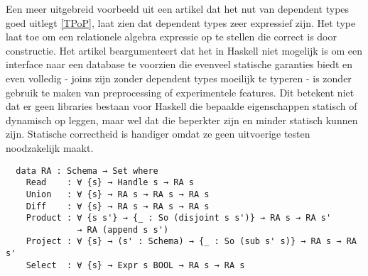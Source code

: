 Een meer uitgebreid voorbeeld uit een artikel dat het nut van dependent types
goed uitlegt \ref{TPoP}, laat zien dat dependent types zeer expressief zijn.
Het type  laat toe om een relationele algebra expressie op te stellen
die correct is door constructie. Het artikel beargumenteert dat het in Haskell
niet mogelijk is om een interface naar een database te voorzien die evenveel
statische garanties biedt en even volledig - joins zijn zonder dependent types
moeilijk te typeren - is zonder gebruik te maken van preprocessing of
experimentele features. Dit betekent niet dat er geen libraries bestaan voor
Haskell die bepaalde eigenschappen statisch of dynamisch op leggen, maar wel
dat die beperkter zijn en minder statisch kunnen zijn. Statische correctheid is
handiger omdat ze geen uitvoerige testen noodzakelijk maakt.

\begin{verbatim}
  data RA : Schema → Set where
    Read    : ∀ {s} → Handle s → RA s
    Union   : ∀ {s} → RA s → RA s → RA s
    Diff    : ∀ {s} → RA s → RA s → RA s
    Product : ∀ {s s'} → {_ : So (disjoint s s')} → RA s → RA s'
              → RA (append s s')
    Project : ∀ {s} → (s' : Schema) → {_ : So (sub s' s)} → RA s → RA s'
    Select  : ∀ {s} → Expr s BOOL → RA s → RA s
\end{verbatim}

